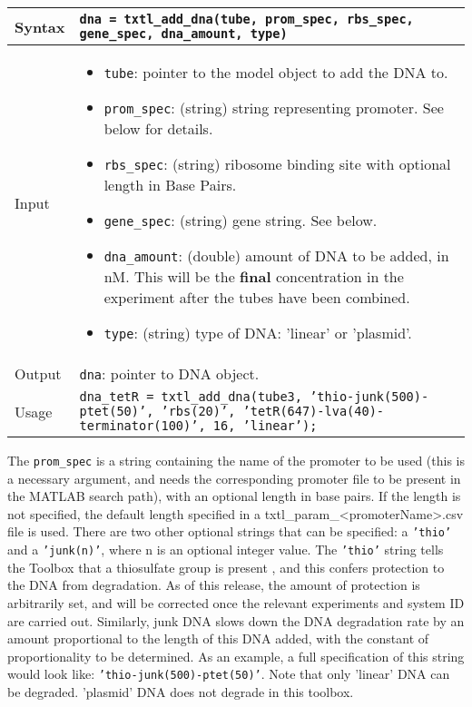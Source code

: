 			\begin{tabular}{p{2cm}|p{13cm}}
			Syntax & \texttt{dna = txtl\_add\_dna(tube, prom\_spec, rbs\_spec, gene\_spec, dna\_amount, type)}\\ \hline
			Input &  \begin{itemize}
				\item \texttt{tube}: pointer to the model object to add the DNA to.
				\item \texttt{prom\_spec}: (string) string representing promoter. See below for details. 
				\item \texttt{rbs\_spec}: (string) ribosome binding site with optional length in Base Pairs.
				\item \texttt{gene\_spec}: (string) gene string. See below.
				\item \texttt{dna\_amount}: (double) amount of DNA to be added, in nM. This will be the \textbf{final} concentration in the experiment after the tubes have been combined. 
				\item \texttt{type}: (string) type of DNA: 'linear' or 'plasmid'. 
				\end{itemize} \\ \hline
			Output & \texttt{dna}: pointer to DNA object. \\ \hline
			Usage & \texttt{dna\_tetR = txtl\_add\_dna(tube3, 'thio-junk(500)-ptet(50)', 'rbs(20)', 'tetR(647)-lva(40)-terminator(100)', 16, 'linear');}\\ \hline
			\end{tabular}	
			
			\vspace{1\baselineskip}
						
The \texttt{prom\_spec} is a string containing the name of the promoter to be used (this is a necessary argument, and needs the corresponding promoter file to be present in the MATLAB search path), with an optional length in base pairs. If the length is not specified, the default length specified in a \textsf{txtl\_param\_<promoterName>.csv} file is used. There are two other optional strings that can be specified: a \texttt{'thio'} and a \texttt{'junk(n)'}, where n is an optional integer value. The \texttt{'thio'} string tells the Toolbox that a thiosulfate group is present , and this confers protection to the DNA from degradation. As of this release, the amount of protection is arbitrarily set, and will be corrected once the relevant experiments and system ID are carried out. Similarly, junk DNA slows down the DNA degradation rate by an amount proportional to the length of this DNA added, with the constant of proportionality to be determined. As an example, a full specification of this string would look like: \texttt{'thio-junk(500)-ptet(50)'}. Note that only 'linear' DNA can be degraded. 'plasmid' DNA does not degrade in this toolbox. 


